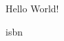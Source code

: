 \documentclass{minimal}
\begin{document}
Hello World!

\gls{isbn}



\printunsrtglossaries
\end{document}
